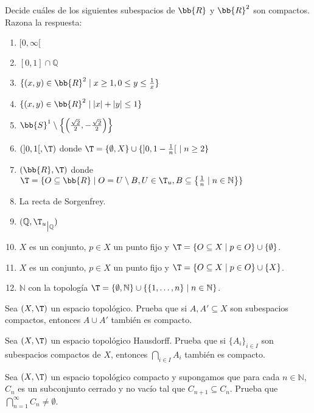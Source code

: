 \begin{ejercicio}
Decide cuáles de los siguientes subespacios de $ \bb{R} $ y $ \bb{R}^2 $ son compactos. Razona la respuesta:
\begin{enumerate}
    \item $ [0, \infty[ $
    \item $ [0, 1] \cap \mathbb{Q} $
    \item $ \{(x, y) \in \bb{R}^2 \mid x \geq 1, 0 \leq y \leq \frac{1}{x}\} $
    \item $ \{(x, y) \in \bb{R}^2 \mid |x| + |y| \leq 1\} $
    \item $ \bb{S}^1 \setminus \left\{\left(\frac{\sqrt{2}}{2}, -\frac{\sqrt{2}}{2}\right)\right\} $
    \item $ (]0, 1[, \T) $ donde $ \T = \{\emptyset, X\} \cup \{]0, 1 - \frac{1}{n}[~\mid n \geq 2\} $
    \item $ (\bb{R}, \T) $ donde $ \T = \{O \subseteq \bb{R} \mid O = U \setminus B, U \in \T_u, B \subseteq \left\{\frac{1}{n} \mid n \in \mathbb{N}\right\}\} $
    \item La recta de Sorgenfrey.
    \item $ (\mathbb{Q}, {\T_u}_{\big |\mathbb{Q}}) $
    \item $ X $ es un conjunto, $ p \in X $ un punto fijo y $ \T = \{O \subseteq X \mid p \in O\} \cup \{\emptyset\} $.
    \item $ X $ es un conjunto, $ p \in X $ un punto fijo y $ \T = \{O \subseteq X \mid p \in O\} \cup \{X\} $.
    \item $ \mathbb{N} $ con la topología $ \T = \{\emptyset, \mathbb{N}\} \cup \{\{1, \ldots, n\} \mid n \in \mathbb{N}\} $.
\end{enumerate}
\end{ejercicio}

\begin{ejercicio}
Sea $(X, \T)$ un espacio topológico. Prueba que si $ A, A' \subseteq X $ son subespacios compactos, entonces $ A \cup A' $ también es compacto.
\end{ejercicio}


\begin{ejercicio}
Sea $(X, \T)$ un espacio topológico Hausdorff. Prueba que si $\{A_i\}_{i \in I}$ son subespacios compactos de $X$, entonces $\bigcap\limits_{i \in I} A_i$ también es compacto.
\end{ejercicio}

\begin{ejercicio}
Sea $(X, \T)$ un espacio topológico compacto y supongamos que para cada $n \in \mathbb{N}$, $C_n$ es un subconjunto cerrado y no vacío tal que $C_{n+1} \subseteq C_n$. Prueba que $\bigcap\limits_{n=1}^{\infty} C_n \neq \emptyset$.
\end{ejercicio}

